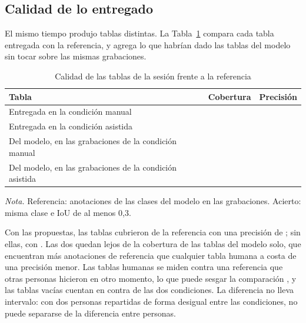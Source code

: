 \subsection{Calidad de lo entregado}

El mismo tiempo produjo tablas distintas. La Tabla~\ref{tab:calidad-sesion}
compara cada tabla entregada con la referencia, y agrega lo que habrían dado las
tablas del modelo sin tocar sobre las mismas grabaciones.

\begin{table}[htbp]
    \centering
    \small
    \begin{threeparttable}
        \caption{Calidad de las tablas de la sesión frente a la referencia}
        \label{tab:calidad-sesion}
        \begin{tabular}{@{}lcc@{}}
            \toprule
            \textbf{Tabla} & \textbf{Cobertura} & \textbf{Precisión} \\
            \midrule
            Entregada en la condición manual & \uRecallManual{} & \uPrecisionManual{} \\
            Entregada en la condición asistida & \uRecallAssisted{} & \uPrecisionAssisted{} \\
            \addlinespace
            Del modelo, en las grabaciones de la condición manual & \uModelRecallManual{} & \uModelPrecisionManual{} \\
            Del modelo, en las grabaciones de la condición asistida & \uModelRecallAssisted{} & \uModelPrecisionAssisted{} \\
            \bottomrule
        \end{tabular}
        \begin{tablenotes}[flushleft]
            \footnotesize
            \item \textit{Nota.} Referencia: \uSessionRef{} anotaciones de las
            clases del modelo en las \uSessionRecordings{} grabaciones. Acierto:
            misma clase e IoU de al menos 0,3.
        \end{tablenotes}
    \end{threeparttable}
\end{table}

Con las propuestas, las tablas cubrieron \uRecallAssisted{} de la referencia con
una precisión de \uPrecisionAssisted{}; sin ellas, \uRecallManual{} con
\uPrecisionManual{}. Las dos quedan lejos de la cobertura de las tablas del
modelo solo, que encuentran más anotaciones de referencia que cualquier tabla
humana a costa de una precisión menor. Las tablas humanas se miden contra una
referencia que otras personas hicieron en otro momento, lo que puede sesgar la
comparación \citep{koga_lead_2024}, y las \uEmptyTables{}
tablas vacías cuentan en contra de las dos condiciones. La diferencia no lleva
intervalo: con dos personas repartidas de forma desigual entre las condiciones,
no puede separarse de la diferencia entre personas.

